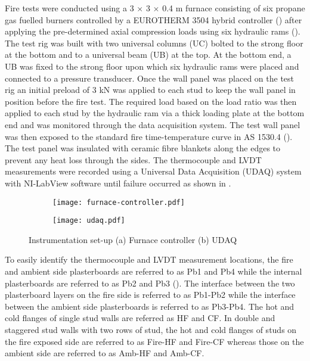 Fire tests were conducted using a 3 \(\times\) 3 \(\times\) 0.4 m furnace consisting of six propane gas fuelled burners controlled by a EUROTHERM 3504 hybrid controller () after applying the pre-determined axial compression loads using six hydraulic rams (). The test rig was built with two universal columns (UC) bolted to the strong floor at the bottom and to a universal beam (UB) at the top. At the bottom end, a UB was fixed to the strong floor upon which six hydraulic rams were placed and connected to a pressure transducer. Once the wall panel was placed on the test rig an initial preload of 3 kN was applied to each stud to keep the wall panel in position before the fire test. The required load based on the load ratio was then applied to each stud by the hydraulic ram via a thick loading plate at the bottom end and was monitored through the data acquisition system. The test wall panel was then exposed to the standard fire time-temperature curve in AS 1530.4 (\cite{StandardsAustral2014}). The test panel was insulated with ceramic fibre blankets along the edges to prevent any heat loss through the sides. The thermocouple and LVDT measurements were recorded using a Universal Data Acquisition (UDAQ) system with NI-LabView software until failure occurred as shown in . 
\begin{figure}[!htbp]
	\centering
	\begin{subfigure}[b]{0.42\textwidth}
		\centering
		\texttt{[image: furnace-controller.pdf]}
		\caption{}
		\label{subfig:furnace-controller}
	\end{subfigure}
	\begin{subfigure}[b]{0.42\textwidth}
		\centering
		\texttt{[image: udaq.pdf]}
		\caption{}
		\label{subfig:udaq}
	\end{subfigure}
	   \caption{Instrumentation set-up (a) Furnace controller (b) UDAQ}
	   \label{fig:furnace-controller-set-up}
\end{figure}

To easily identify the thermocouple and LVDT measurement locations, the fire and ambient side plasterboards are referred to as Pb1 and Pb4 while the internal plasterboards are referred to as Pb2 and Pb3 (). The interface between the two plasterboard layers on the fire side is referred to as Pb1-Pb2 while the interface between the ambient side plasterboards is referred to as Pb3-Pb4. The hot and cold flanges of single stud walls are referred as HF and CF. In double and staggered stud walls with two rows of stud, the hot and cold flanges of studs on the fire exposed side are referred to as Fire-HF and Fire-CF whereas those on the ambient side are referred to as Amb-HF and Amb-CF.

